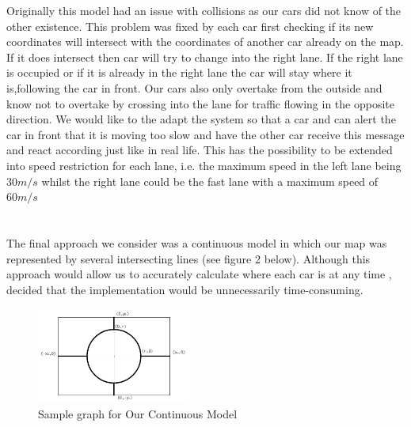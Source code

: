 \documentclass[11pt]{article}
\begin{document}
	Originally this model had an issue with collisions as our cars did not know of the other existence. This problem was fixed by each car first checking if its new coordinates will intersect with the coordinates of another car already on the map. If it does intersect then car will try to change into the right lane. If the right lane is occupied or if it is already in the right lane the car will stay where it is,following the car in front. Our cars also only overtake from the outside and know not to overtake by crossing into the lane for traffic flowing in the opposite direction. We would like to the adapt the system so that a car and can alert the car in front that it is moving too slow and have the other car receive this message and react according just like in real life. This has the possibility to be extended into speed restriction for each lane, i.e. the maximum speed in the left lane being $30m/s$ whilst the right lane could be the fast lane with a maximum speed of $60m/s$\\
	
	\\\\
	The final approach we consider was a continuous model in which our map was represented by several intersecting lines (see figure 2 below). Although this approach would allow us to accurately calculate where each car is at any time , decided that the implementation would be unnecessarily time-consuming.  
	
	\FloatBarrier
	\begin{figure}
		\centering
		\includegraphics[width=0.45\textwidth]{KimsModel}
		\caption{Sample graph for Our Continuous Model}
	\end{figure}
	
\end{document}

